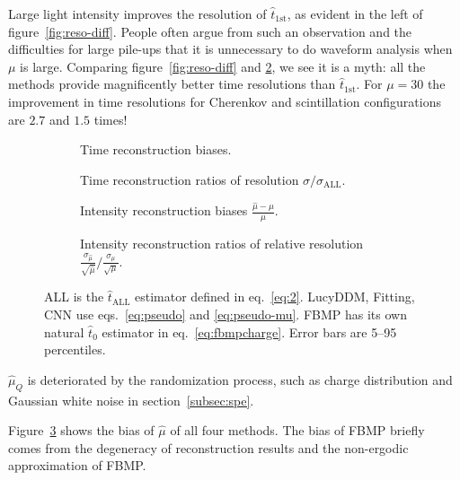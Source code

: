 Large light intensity improves the resolution of $\hat{t}_\mathrm{1st}$, as evident in the left of figure~\ref{fig:reso-diff}.  People often argue from such an observation and the difficulties for large pile-ups that it is unnecessary to do waveform analysis when $\mu$ is large.  Comparing figure~\ref{fig:reso-diff} and \ref{fig:deltamethods}, we see it is a myth: all the methods provide magnificently better time resolutions than $\hat{t}_\mathrm{1st}$. For $\mu=30$ the improvement in time resolutions for Cherenkov and scintillation configurations are $2.7$ and $1.5$ times!

\begin{figure}[H]
  \begin{subfigure}[b]{\textwidth}
    \centering
    \resizebox{\textwidth}{!}{}
    \caption{\label{fig:biasmethods} Time reconstruction biases.}
  \end{subfigure}
  \begin{subfigure}[b]{\textwidth}
    \centering
    \resizebox{\textwidth}{!}{}
    \caption{\label{fig:deltamethods} Time reconstruction ratios of resolution $\sigma/\sigma_{\mathrm{ALL}}$.}
  \end{subfigure}
  \begin{subfigure}[b]{\textwidth}
    \centering
    \resizebox{\textwidth}{!}{}
    \caption{\label{fig:biasmu} Intensity reconstruction biases $\frac{\hat{\mu} - \mu}{\mu}$.}
  \end{subfigure}
  \begin{subfigure}[b]{\textwidth}
    \centering
    \resizebox{\textwidth}{!}{}
    \caption{\label{fig:deltamu} Intensity reconstruction ratios of relative resolution $\frac{\sigma_{\hat{\mu}}}{\sqrt{\hat{\mu}}}/\frac{\sigma_\mu}{\sqrt{\mu}}$. }
  \end{subfigure}
  \caption{ALL is the $\hat{t}_\mathrm{ALL}$ estimator defined in eq.~\eqref{eq:2}. LucyDDM, Fitting, CNN use eqs.~\eqref{eq:pseudo} and \eqref{eq:pseudo-mu}.  FBMP has its own natural $\hat{t}_0$ estimator in eq.~\eqref{eq:fbmpcharge}. Error bars are 5--95 percentiles.}
\end{figure}

$\hat{\mu}_Q$ is deteriorated by the randomization process, such as charge distribution and Gaussian white noise in section~\ref{subsec:spe}. 

Figure~\ref{fig:biasmu} shows the bias of $\hat{\mu}$ of all four methods. The bias of FBMP briefly comes from the degeneracy of reconstruction results and the non-ergodic approximation of FBMP. 

